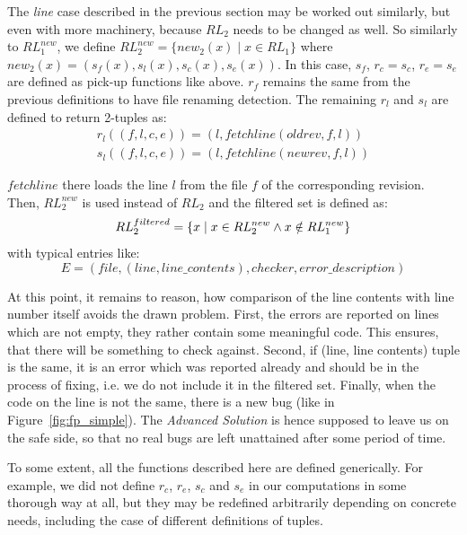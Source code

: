 \documentclass{acm_proc_article-sp}
\begin{document}
The \textit{line} case described in the previous section may be worked out
similarly, but even with more machinery, because $RL_2$ needs to be changed as
well. So similarly to $RL_1^{new}$, we define $RL_2^{new} = \{new_2(x) \mid x
\in RL_1\}$ where $new_2(x) = (s_f(x),s_l(x),s_c(x),s_e(x))$. In this case,
$s_f$, $r_c=s_c$, $r_e=s_e$ are defined as pick-up functions like above. $r_f$
remains the same from the previous definitions to have file renaming
detection. The remaining $r_l$ and $s_l$ are defined to return 2-tuples as:
\begin{displaymath}
\begin{matrix}
r_l((f,l,c,e))=(l, fetchline(oldrev,f,l)) \\
s_l((f,l,c,e))=(l, fetchline(newrev,f,l))
\end{matrix}
\end{displaymath}

$fetchline$ there loads the line $l$ from the file $f$ of the corresponding
revision. Then, $RL_2^{new}$ is used instead of $RL_2$ and the filtered set is
defined as:
\begin{displaymath}
RL_2^{filtered} = \{x \mid x \in RL_2^{new} \wedge x \notin RL_1^{new}\} \\
\end{displaymath}
with typical entries like:
\begin{displaymath}
E=(file,(line,line\_contents),checker,error\_description)
\end{displaymath}

At this point, it remains to reason, how comparison of the line contents with
line number itself avoids the drawn problem. First, the errors are reported on
lines which are not empty, they rather contain some meaningful code. This
ensures, that there will be something to check against. Second, if (line, line
contents) tuple is the same, it is an error which was reported already and
should be in the process of fixing, i.e.  we do not include it in the filtered
set. Finally, when the code on the line is not the same, there is a new bug
(like in Figure~\ref{fig:fp_simple}). The \emph{Advanced Solution} is hence
supposed to leave us on the safe side, so that no real bugs are left
unattained after some period of time.

To some extent, all the functions described here are defined generically. For
example, we did not define $r_c$, $r_e$, $s_c$ and $s_e$ in our computations
in some thorough way at all, but they may be redefined arbitrarily depending
on concrete needs, including the case of different definitions of tuples.
\end{document}
